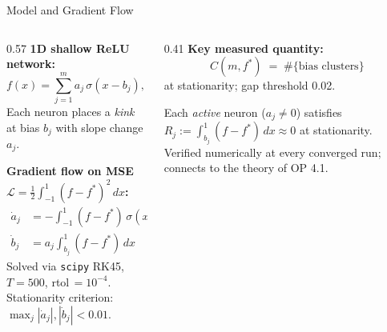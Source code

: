 \documentclass[aspectratio=169, 10pt]{beamer}
\newcommand{\fstar}{f^\ast}
\begin{document}
\begin{frame}{Model and Gradient Flow}
  \begin{columns}[T]
    \begin{column}{0.57\textwidth}
      \textbf{1D shallow ReLU network:}
      \[
        f(x) = \sum_{j=1}^{m} a_j\,\sigma(x - b_j),
        \quad \sigma = \max(0,\cdot),\quad x \in [-1,1]
      \]
      Each neuron places a \emph{kink} at bias $b_j$
      with slope change $a_j$.

      \vspace{0.3em}
      \textbf{Gradient flow on MSE\;} $\mathcal{L}
        = \tfrac{1}{2}\int_{-1}^{1}(f - \fstar)^2\,dx$\textbf{:}
      \begin{align*}
        \dot{a}_j &= -\!\int_{-1}^{1}\!(f-\fstar)\,\sigma(x-b_j)\,dx \\[-2pt]
        \dot{b}_j &= a_j\!\int_{b_j}^{1}\!(f-\fstar)\,dx
      \end{align*}
      \vspace{2pt}
      \small Solved via \texttt{scipy} RK45, $T=500$,
      rtol\,$=10^{-4}$. Stationarity criterion:
      $\max_j|\dot{a}_j|,|\dot{b}_j| < 0.01$.
    \end{column}
    \begin{column}{0.41\textwidth}
      \textbf{Key measured quantity:}
      \[
        C(m,\fstar) \;=\; \#\{\text{bias clusters}\}
      \]
      \small at stationarity; gap threshold 0.02.

      \vspace{0.2em}
      \begin{tcolorbox}[slideboxB, title={Fixed-point condition}]
        \small
        Each \emph{active} neuron ($a_j \neq 0$) satisfies
        $R_j \!:=\! \int_{b_j}^{1}\!(f{-}\fstar)\,dx \approx 0$
        at stationarity.
        Verified numerically at every converged run;
        connects to the theory of OP 4.1.
      \end{tcolorbox}
    \end{column}
  \end{columns}
\end{frame}
\end{document}
